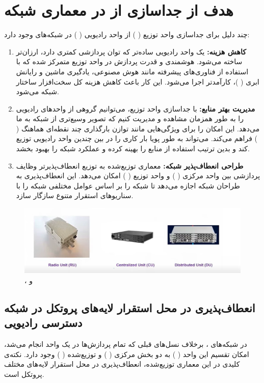 \documentclass[landscape, 12pt]{report}
\begin{document}
\section*{
	هدف از جداسازی
	 از
	   در معماری شبکه 
	    }	 
چند دلیل برای جداسازی واحد توزیع (
) از واحد رادیویی (
) در شبکه‌های
  وجود دارد:
  \begin{enumerate}
  	\item
  	\textbf{کاهش هزینه:}
  	 یک واحد رادیویی ساده‌تر که توان پردازشی کمتری دارد، ارزان‌تر ساخته می‌شود. هوشمندی و قدرت پردازش در واحد توزیع متمرکز شده که با استفاده از فناوری‌های پیشرفته مانند هوش مصنوعی، یادگیری ماشین و رایانش ابری (
  	 )، کارآمدتر اجرا می‌شود. این کار باعث کاهش هزینه کل سخت‌افزار  ساختار شبکه می‌شود.
  	\item
  	\textbf{مدیریت بهتر منابع:}
  	با جداسازی واحد توزیع، می‌توانیم گروهی از واحدهای رادیویی را به طور همزمان مشاهده و مدیریت کنیم که تصویر وسیع‌تری از شبکه به ما می‌دهد. این امکان را برای ویژگی‌هایی مانند توازن بارگذاری چند نقطه‌ای هماهنگ (
  	) فراهم می‌کند.
  	می‌تواند به طور پویا بار کاری را در بین چندین واحد رادیویی توزیع کند و بدین ترتیب استفاده از منابع را بهینه کرده و عملکرد شبکه را بهبود بخشد.
  	\item 
  	\textbf{طراحی انعطاف‌پذیر شبکه:} 
  	معماری توزیع‌شده به توزیع انعطاف‌پذیرتر وظایف پردازشی بین واحد مرکزی (
  	) و واحد توزیع (
  	) امکان می‌دهد. این انعطاف‌پذیری به طراحان شبکه اجازه می‌دهد تا شبکه را بر اساس عوامل مختلفی شبکه را با سناریوهای استقرار متنوع سازگار سازد.
  \end{enumerate}

\begin{figure}[ht]
	\centering
	\includegraphics[width=.6\linewidth]{Pic/RU_CU_DU}
	\caption{
		،
		و 
	}
	\label{fig:RU_CU_DU}
\end{figure}
 
 \subsection*{ انعطاف‌پذیری در محل استقرار لایه‌های پروتکل در شبکه دسترسی رادیویی
 	}
 در شبکه‌های 
 ، برخلاف نسل‌های قبلی که تمام پردازش‌ها در یک واحد انجام می‌شد، امکان تقسیم این واحد ( 
 )
  به دو بخش مرکزی (
  ) و توزیع‌شده (
  ) وجود دارد. نکته‌ی کلیدی در این معماری توزیع‌شده، انعطاف‌پذیری در محل استقرار لایه‌های مختلف پروتکل است.
 
\end{document}
